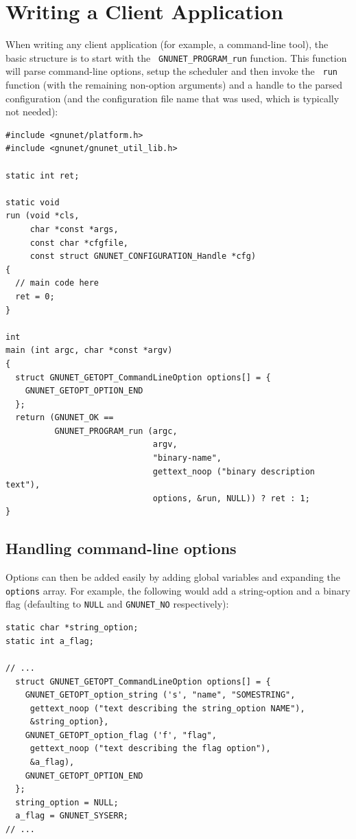 \documentclass[10pt]{article}
\begin{document}
\section{Writing a Client Application}

When writing any client application (for example, a command-line
tool), the basic structure is to start with the {\tt
  GNUNET\_PROGRAM\_run} function.  This function will parse
command-line options, setup the scheduler and then invoke the {\tt
  run} function (with the remaining non-option arguments) and a handle
to the parsed configuration (and the configuration file name that was
used, which is typically not needed):

\lstset{language=C}
\begin{lstlisting}
#include <gnunet/platform.h>
#include <gnunet/gnunet_util_lib.h>

static int ret;

static void
run (void *cls,
     char *const *args,
     const char *cfgfile,
     const struct GNUNET_CONFIGURATION_Handle *cfg)
{
  // main code here
  ret = 0;
}

int
main (int argc, char *const *argv)
{
  struct GNUNET_GETOPT_CommandLineOption options[] = {
    GNUNET_GETOPT_OPTION_END
  };
  return (GNUNET_OK ==
          GNUNET_PROGRAM_run (argc,
                              argv,
                              "binary-name",
                              gettext_noop ("binary description text"),
                              options, &run, NULL)) ? ret : 1;
}
\end{lstlisting}

\subsection{Handling command-line options}

Options can then be added easily by adding global variables and
expanding the {\tt options} array.  For example, the following would
add a string-option and a binary flag (defaulting to {\tt NULL} and
{\tt GNUNET\_NO} respectively):

\lstset{language=C}
\begin{lstlisting}
static char *string_option;
static int a_flag;

// ...
  struct GNUNET_GETOPT_CommandLineOption options[] = {
    GNUNET_GETOPT_option_string ('s', "name", "SOMESTRING",
     gettext_noop ("text describing the string_option NAME"),
     &string_option},
    GNUNET_GETOPT_option_flag ('f', "flag",
     gettext_noop ("text describing the flag option"), 
     &a_flag),
    GNUNET_GETOPT_OPTION_END
  };
  string_option = NULL;
  a_flag = GNUNET_SYSERR;
// ...
\end{lstlisting}
\end{document}
